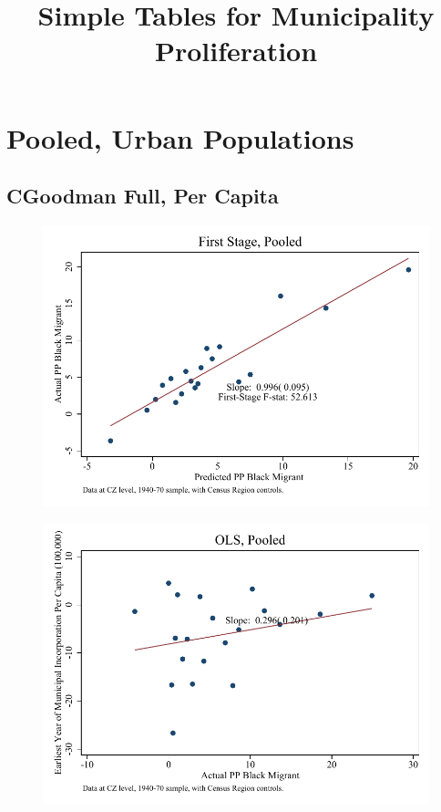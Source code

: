 \documentclass{article}
\title{Simple Tables for Municipality Proliferation}
\begin{document}
\maketitle
\tableofcontents
{\footnotesize 
\listoffigures
\listoftables}
\clearpage

\section{Pooled, Urban Populations}


\subsection{CGoodman Full, Per Capita}

\clearpage
\begin{figure}
\centering
\includegraphics{figures/simplefigs/pooled_cgoodman_full_pc_C3_fs.pdf}
\end{figure}
\clearpage
\begin{figure}
\centering
\includegraphics{figures/simplefigs/pooled_cgoodman_full_pc_C3_ols.pdf}
\end{figure}
\end{document}
